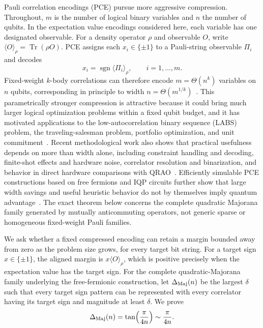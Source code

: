 \documentclass[10pt,aps,pra,twocolumn,superscriptaddress,nofootinbib,longbibliography]{revtex4-2}
\newcommand{\Tr}{\operatorname{Tr}}
\newcommand{\sgn}{\operatorname{sgn}}
\begin{document}
Pauli correlation encodings (PCE) pursue more aggressive compression.  Throughout, $m$ is the number of logical binary variables and $n$ the number of qubits.  In the expectation value encodings considered here, each variable has one designated observable.  For a density operator $\rho$ and observable $O$, write $\langle O\rangle_\rho=\Tr(\rho O)$.  PCE assigns each $x_i\in\{\pm1\}$ to a Pauli-string observable $\Pi_i$ and decodes
\begin{equation}
    x_i=\sgn\langle \Pi_i\rangle_\rho,\qquad i=1,\ldots,m.
    \label{eq:pce}
\end{equation}
Fixed-weight $k$-body correlations can therefore encode $m=\Theta(n^k)$ variables on $n$ qubits, corresponding in principle to width $n=\Theta(m^{1/k})$~\cite{Sciorilli2025PCE}.  This parametrically stronger compression is attractive because it could bring much larger logical optimization problems within a fixed qubit budget, and it has motivated applications to the low-autocorrelation binary sequence (LABS) problem, the traveling-salesman problem, portfolio optimization, and unit commitment~\cite{Sciorilli2025LABS,doCarmo2026WarmPCE,Soloviev2026Portfolio,Nguyen2026UnitCommitment}.  Recent methodological work also shows that practical usefulness depends on more than width alone, including constraint handling and decoding, finite-shot effects and hardware noise, correlator resolution and binarization, and behavior in direct hardware comparisons with QRAO~\cite{Padin2026ConstrainedPCE,Friedhoff2026ProblemAwarePCE,Alonso2026Benchmark,Yoshioka2026LargeScalePCE,Sharma2026Hardware}.  Efficiently simulable PCE constructions based on free fermions and IQP circuits further show that large width savings and useful heuristic behavior do not by themselves imply quantum advantage~\cite{LizzioBosco2026SimulablePCE}.  The exact theorem below concerns the complete quadratic Majorana family generated by mutually anticommuting operators, not generic sparse or homogeneous fixed-weight Pauli families.

We ask whether a fixed compressed encoding can retain a margin bounded away from zero as the problem size grows, for every target bit string.  For a target sign $x\in\{\pm1\}$, the aligned margin is $x\langle O\rangle_\rho$, which is positive precisely when the expectation value has the target sign.  For the complete quadratic-Majorana family underlying the free-fermionic construction, let $\Delta_{\rm Maj}(n)$ be the largest $\delta$ such that every target sign pattern can be represented with every correlator having its target sign and magnitude at least $\delta$.  We prove
\begin{equation}
    \Delta_{\rm Maj}(n)=\tan\!\left(\frac{\pi}{4n}\right)
    \sim \frac{\pi}{4n}.
    \label{eq:headline-margin}
\end{equation}
\end{document}
